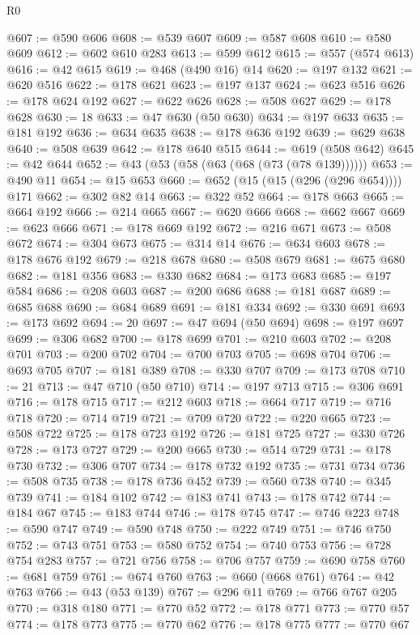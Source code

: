 \begin{lexlean}{R0}
\begin{coremodule}
@607 := @590 @606
@608 := @539 @607
@609 := @587 @608
@610 := @580 @609
@612 := @602 @610 @283
@613 := @599 @612
@615 := @557 (@574 @613)
@616 := @42 @615
@619 := @468 (@490 @16) @14
@620 := @197 @132
@621 := @620 @516
@622 := @178 @621
@623 := @197 @137
@624 := @623 @516
@626 := @178 @624 @192
@627 := @622 @626
@628 := @508 @627
@629 := @178 @628
@630 := 18
@633 := @47 @630 (@50 @630)
@634 := @197 @633
@635 := @181 @192
@636 := @634 @635
@638 := @178 @636 @192
@639 := @629 @638
@640 := @508 @639
@642 := @178 @640 @515
@644 := @619 (@508 @642)
@645 := @42 @644
@652 := @43 (@53 (@58 (@63 (@68 (@73 (@78 @139))))))
@653 := @490 @11
@654 := @15 @653
@660 := @652 (@15 (@15 (@296 (@296 @654)))) @171
@662 := @302 @82 @14
@663 := @322 @52
@664 := @178 @663
@665 := @664 @192
@666 := @214 @665
@667 := @620 @666
@668 := @662 @667
@669 := @623 @666
@671 := @178 @669 @192
@672 := @216 @671
@673 := @508 @672
@674 := @304 @673
@675 := @314 @14
@676 := @634 @603
@678 := @178 @676 @192
@679 := @218 @678
@680 := @508 @679
@681 := @675 @680
@682 := @181 @356
@683 := @330 @682
@684 := @173 @683
@685 := @197 @584
@686 := @208 @603
@687 := @200 @686
@688 := @181 @687
@689 := @685 @688
@690 := @684 @689
@691 := @181 @334
@692 := @330 @691
@693 := @173 @692
@694 := 20
@697 := @47 @694 (@50 @694)
@698 := @197 @697
@699 := @306 @682
@700 := @178 @699
@701 := @210 @603
@702 := @208 @701
@703 := @200 @702
@704 := @700 @703
@705 := @698 @704
@706 := @693 @705
@707 := @181 @389
@708 := @330 @707
@709 := @173 @708
@710 := 21
@713 := @47 @710 (@50 @710)
@714 := @197 @713
@715 := @306 @691
@716 := @178 @715
@717 := @212 @603
@718 := @664 @717
@719 := @716 @718
@720 := @714 @719
@721 := @709 @720
@722 := @220 @665
@723 := @508 @722
@725 := @178 @723 @192
@726 := @181 @725
@727 := @330 @726
@728 := @173 @727
@729 := @200 @665
@730 := @514 @729
@731 := @178 @730
@732 := @306 @707
@734 := @178 @732 @192
@735 := @731 @734
@736 := @508 @735
@738 := @178 @736 @452
@739 := @560 @738
@740 := @345 @739
@741 := @184 @102
@742 := @183 @741
@743 := @178 @742
@744 := @184 @67
@745 := @183 @744
@746 := @178 @745
@747 := @746 @223
@748 := @590 @747
@749 := @590 @748
@750 := @222 @749
@751 := @746 @750
@752 := @743 @751
@753 := @580 @752
@754 := @740 @753
@756 := @728 @754 @283
@757 := @721 @756
@758 := @706 @757
@759 := @690 @758
@760 := @681 @759
@761 := @674 @760
@763 := @660 (@668 @761)
@764 := @42 @763
@766 := @43 (@53 @139)
@767 := @296 @11
@769 := @766 @767 @205
@770 := @318 @180
@771 := @770 @52
@772 := @178 @771
@773 := @770 @57
@774 := @178 @773
@775 := @770 @62
@776 := @178 @775
@777 := @770 @67

\end{coremodule}
\end{lexlean}
